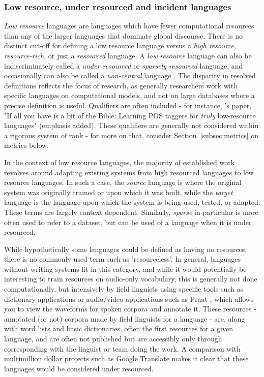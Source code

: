 \subsubsection{Low resource, under resourced and incident languages}

\textit{Low resource} languages are languages which have fewer computational resources than any of the larger languages that dominate global discourse. There is no distinct cut-off for defining a low resource language versus a \textit{high resource}, \textit{resource-rich}, or just a \textit{resourced} language. A \textit{low resource} language can also be indiscriminately called a \textit{under resourced} or \textit{sparsely resourced} language, and occasionally can also be called a {\it non-central} language \citep{streiter2006implementing}. The disparity in resolved definitions reflects the focus of research, as generally researchers work with specific languages on computational models, and not on large databases where a precise definition is useful. Qualifiers are often included - for instance, \citet{agic2015if}'s paper, "If all you have is a bit of the Bible: Learning POS taggers for {\it truly} low-resource languages" (emphasis added). These qualifiers are generally not considered within a rigorous system of rank - for more on that, consider Section~\ref{subsec:metrics} on metrics below.

In the context of low resource languages, the majority of established work revolves around adapting existing systems from high resourced languages to low resource languages. In such a case, the \textit{source} language is where the original system was originally trained or upon which it was built, while the \textit{target} language is the language upon which the system is being used, tested, or adapted. These terms are largely context dependent. Similarly, \textit{sparse} in particular is more often used to refer to a dataset, but can be used of a language when it is under resourced.

While hypothetically some languages could be defined as having no resources, there is no commonly used term such as 'resourceless'. In general, languages without writing systems fit in this category, and while it would potentially be interesting to train resources on audio-only vocabulary, this is generally not done computationally, but intensively by field linguists using specific tools such as dictionary applications or audio/video applications such as Praat \citep{boersma2009praat}, which allows you to view the waveforms for spoken corpora and annotate it. These resources - annotated (or not) corpora made by field linguists for a language - are, along with word lists and basic dictionaries, often the first resources for a given language, and are often not published but are accessibly only through corresponding with the linguist or team doing the work. A comparison with multimillion dollar projects such as Google Translate makes it clear that these languages would be considered under resourced.

